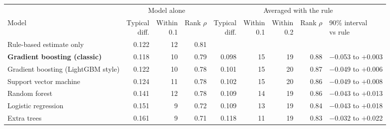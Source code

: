 \begin{tabular}{lrrrrrrrl}
\toprule
& \multicolumn{3}{c}{Model alone} & \multicolumn{5}{c}{Averaged with the rule} \\ \cmidrule(lr){2-4}\cmidrule(lr){5-9}Model & \makecell[r]{Typical\\diff.} & \makecell[r]{Within\\0.1} & \makecell[r]{Rank\\$\rho$} & \makecell[r]{Typical\\diff.} & \makecell[r]{Within\\0.1} & \makecell[r]{Within\\0.2} & \makecell[r]{Rank\\$\rho$} & \makecell[l]{90\% interval\\vs rule} \\
\midrule
Rule-based estimate only & 0.122 & 12 & 0.81 &  &  &  &  &  \\
\midrule
\textbf{Gradient boosting (classic)} & 0.118 & 10 & 0.79 & 0.098 & 15 & 19 & 0.88 & $-$0.053 to $+$0.003 \\
Gradient boosting (LightGBM style) & 0.122 & 10 & 0.78 & 0.101 & 15 & 20 & 0.87 & $-$0.049 to $+$0.006 \\
Support vector machine & 0.124 & 11 & 0.78 & 0.102 & 15 & 20 & 0.86 & $-$0.049 to $+$0.008 \\
Random forest & 0.141 & 12 & 0.78 & 0.109 & 14 & 19 & 0.86 & $-$0.043 to $+$0.013 \\
Logistic regression & 0.151 & 9 & 0.72 & 0.109 & 13 & 19 & 0.84 & $-$0.043 to $+$0.018 \\
Extra trees & 0.161 & 9 & 0.71 & 0.118 & 11 & 19 & 0.83 & $-$0.032 to $+$0.022 \\
\bottomrule
\end{tabular}
